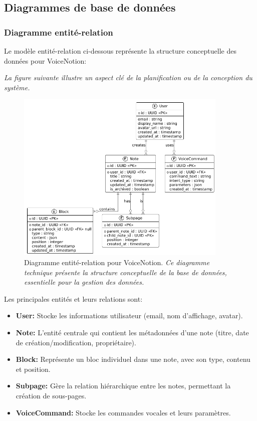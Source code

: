 \subsection{Diagrammes de base de données}

\subsubsection{Diagramme entité-relation}

Le modèle entité-relation ci-dessous représente la structure conceptuelle des données pour VoiceNotion:

\noindent
\textit{La figure suivante illustre un aspect clé de la planification ou de la conception du système.}
\begin{figure}[H]
    \centering
    \includegraphics[width=0.9\textwidth]{assets/docs/voicenotion_er_diagram.png}
    \caption{Diagramme entité-relation pour VoiceNotion. \newline\textit{Ce diagramme technique présente la structure conceptuelle de la base de données, essentielle pour la gestion des données.}}
    \label{fig:er_diagram}
\end{figure}

Les principales entités et leurs relations sont:

\begin{itemize}
    \item \textbf{User:} Stocke les informations utilisateur (email, nom d'affichage, avatar).
    
    \item \textbf{Note:} L'entité centrale qui contient les métadonnées d'une note (titre, date de création/modification, propriétaire).
    
    \item \textbf{Block:} Représente un bloc individuel dans une note, avec son type, contenu et position.
    
    \item \textbf{Subpage:} Gère la relation hiérarchique entre les notes, permettant la création de sous-pages.
    
    \item \textbf{VoiceCommand:} Stocke les commandes vocales et leurs paramètres.
\end{itemize}

